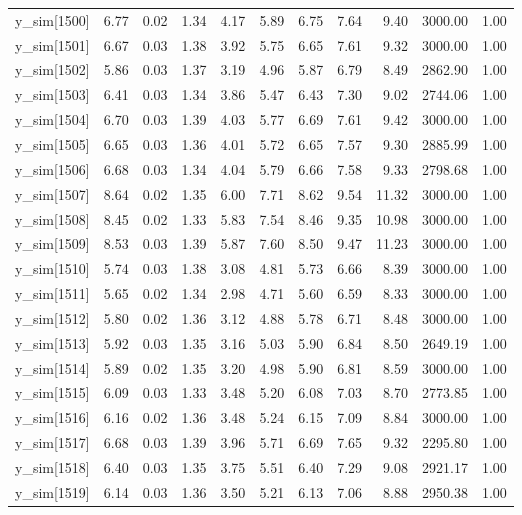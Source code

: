 \begin{table}[ht]
\begin{tabular}{rrrrrrrrrrr}
  y\_sim[1500] & 6.77 & 0.02 & 1.34 & 4.17 & 5.89 & 6.75 & 7.64 & 9.40 & 3000.00 & 1.00 \\ 
  y\_sim[1501] & 6.67 & 0.03 & 1.38 & 3.92 & 5.75 & 6.65 & 7.61 & 9.32 & 3000.00 & 1.00 \\ 
  y\_sim[1502] & 5.86 & 0.03 & 1.37 & 3.19 & 4.96 & 5.87 & 6.79 & 8.49 & 2862.90 & 1.00 \\ 
  y\_sim[1503] & 6.41 & 0.03 & 1.34 & 3.86 & 5.47 & 6.43 & 7.30 & 9.02 & 2744.06 & 1.00 \\ 
  y\_sim[1504] & 6.70 & 0.03 & 1.39 & 4.03 & 5.77 & 6.69 & 7.61 & 9.42 & 3000.00 & 1.00 \\ 
  y\_sim[1505] & 6.65 & 0.03 & 1.36 & 4.01 & 5.72 & 6.65 & 7.57 & 9.30 & 2885.99 & 1.00 \\ 
  y\_sim[1506] & 6.68 & 0.03 & 1.34 & 4.04 & 5.79 & 6.66 & 7.58 & 9.33 & 2798.68 & 1.00 \\ 
  y\_sim[1507] & 8.64 & 0.02 & 1.35 & 6.00 & 7.71 & 8.62 & 9.54 & 11.32 & 3000.00 & 1.00 \\ 
  y\_sim[1508] & 8.45 & 0.02 & 1.33 & 5.83 & 7.54 & 8.46 & 9.35 & 10.98 & 3000.00 & 1.00 \\ 
  y\_sim[1509] & 8.53 & 0.03 & 1.39 & 5.87 & 7.60 & 8.50 & 9.47 & 11.23 & 3000.00 & 1.00 \\ 
  y\_sim[1510] & 5.74 & 0.03 & 1.38 & 3.08 & 4.81 & 5.73 & 6.66 & 8.39 & 3000.00 & 1.00 \\ 
  y\_sim[1511] & 5.65 & 0.02 & 1.34 & 2.98 & 4.71 & 5.60 & 6.59 & 8.33 & 3000.00 & 1.00 \\ 
  y\_sim[1512] & 5.80 & 0.02 & 1.36 & 3.12 & 4.88 & 5.78 & 6.71 & 8.48 & 3000.00 & 1.00 \\ 
  y\_sim[1513] & 5.92 & 0.03 & 1.35 & 3.16 & 5.03 & 5.90 & 6.84 & 8.50 & 2649.19 & 1.00 \\ 
  y\_sim[1514] & 5.89 & 0.02 & 1.35 & 3.20 & 4.98 & 5.90 & 6.81 & 8.59 & 3000.00 & 1.00 \\ 
  y\_sim[1515] & 6.09 & 0.03 & 1.33 & 3.48 & 5.20 & 6.08 & 7.03 & 8.70 & 2773.85 & 1.00 \\ 
  y\_sim[1516] & 6.16 & 0.02 & 1.36 & 3.48 & 5.24 & 6.15 & 7.09 & 8.84 & 3000.00 & 1.00 \\ 
  y\_sim[1517] & 6.68 & 0.03 & 1.39 & 3.96 & 5.71 & 6.69 & 7.65 & 9.32 & 2295.80 & 1.00 \\ 
  y\_sim[1518] & 6.40 & 0.03 & 1.35 & 3.75 & 5.51 & 6.40 & 7.29 & 9.08 & 2921.17 & 1.00 \\ 
  y\_sim[1519] & 6.14 & 0.03 & 1.36 & 3.50 & 5.21 & 6.13 & 7.06 & 8.88 & 2950.38 & 1.00 \\ 

\end{tabular}
\end{table}
